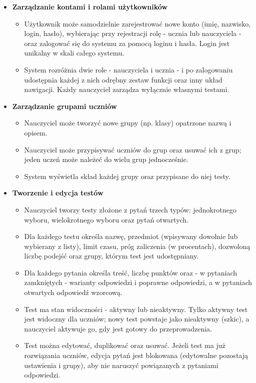 \begin{itemize}
  \item \textbf{Zarządzanie kontami i rolami użytkowników}
  \begin{itemize}
    \item Użytkownik może samodzielnie zarejestrować nowe konto (imię, nazwisko, login, hasło),
          wybierając przy rejestracji rolę - ucznia lub nauczyciela - oraz zalogować się do
          systemu za pomocą loginu i hasła. Login jest unikalny w skali całego systemu.
    \item System rozróżnia dwie role - nauczyciela i ucznia - i po zalogowaniu udostępnia każdej
          z nich odrębny zestaw funkcji oraz inny układ nawigacji. Każdy nauczyciel zarządza
          wyłącznie własnymi testami.
  \end{itemize}

  \item \textbf{Zarządzanie grupami uczniów}
  \begin{itemize}
    \item Nauczyciel może tworzyć nowe grupy (np. klasy) opatrzone nazwą i opisem.
    \item Nauczyciel może przypisywać uczniów do grup oraz usuwać ich z grup; jeden uczeń może
          należeć do wielu grup jednocześnie.
    \item System wyświetla skład każdej grupy oraz przypisane do niej testy.
  \end{itemize}

  \item \textbf{Tworzenie i edycja testów}
  \begin{itemize}
    \item Nauczyciel tworzy testy złożone z pytań trzech typów: jednokrotnego wyboru, wielokrotnego
          wyboru oraz pytań otwartych.
    \item Dla każdego testu określa nazwę, przedmiot (wpisywany dowolnie lub wybierany z listy),
          limit czasu, próg zaliczenia (w procentach), dozwoloną liczbę podejść oraz grupy, którym
          test jest udostępniany.
    \item Dla każdego pytania określa treść, liczbę punktów oraz - w pytaniach zamkniętych -
          warianty odpowiedzi i poprawne odpowiedzi, a w pytaniach otwartych odpowiedź wzorcową.
    \item Test ma stan widoczności - aktywny lub nieaktywny. Tylko aktywny test jest widoczny dla
          uczniów; nowy test powstaje jako nieaktywny (szkic), a nauczyciel aktywuje go, gdy jest
          gotowy do przeprowadzenia.
    \item Test można edytować, duplikować oraz usuwać. Jeżeli test ma już rozwiązania uczniów,
          edycja pytań jest blokowana (edytowalne pozostają ustawienia i grupy), aby nie naruszyć
          powiązanych z pytaniami odpowiedzi.
  \end{itemize}


\end{itemize}
